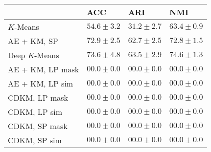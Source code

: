 \begin{table}
{\begin{tabular}{|l|l|l|l|}
    \hline
                      & ACC        &ARI         &NMI       \\ \hline
    $K$-Means         &$54.6\pm3.2$&$31.2\pm2.7$&$63.4\pm0.9$\\ \hline
    AE + KM, SP       &$72.9\pm2.5$&$62.7\pm2.5$&$72.8\pm1.5$\\ \hline
    Deep $K$-Means    &$73.6\pm4.8$&$63.5\pm2.9$&$74.6\pm1.3$\\ \hline
    AE + KM, LP mask  &$00.0\pm0.0$&$00.0\pm0.0$&$00.0\pm0.0$\\ \hline
    AE + KM, LP sim   &$00.0\pm0.0$&$00.0\pm0.0$&$00.0\pm0.0$\\ \hline
  CDKM, LP mask  &$00.0\pm0.0$&$00.0\pm0.0$&$00.0\pm0.0$\\ \hline
       CDKM, LP sim   &$00.0\pm0.0$&$00.0\pm0.0$&$00.0\pm0.0$\\ \hline
       CDKM, SP mask  &$00.0\pm0.0$&$00.0\pm0.0$&$00.0\pm0.0$\\ \hline
       CDKM, SP sim   &$00.0\pm0.0$&$00.0\pm0.0$&$00.0\pm0.0$\\ \hline
\end{tabular}
}
\end{table}

